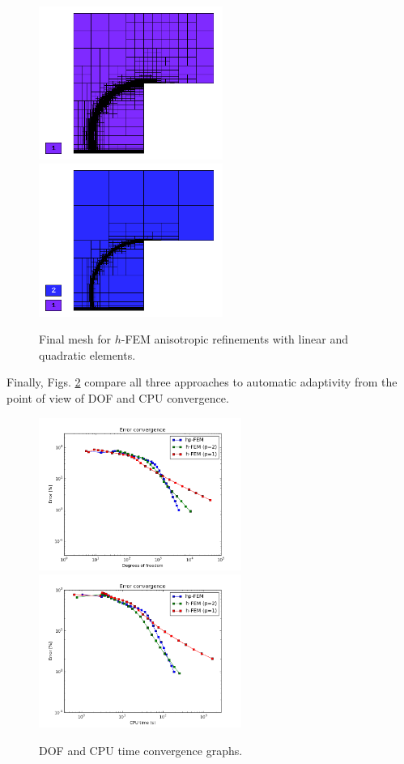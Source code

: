 \begin{figure}[!ht]
\centering
\includegraphics[height=5cm]{nist/nist-12/mesh_h1_aniso.png}\ \
\includegraphics[height=5cm]{nist/nist-12/mesh_h2_aniso.png}
\caption{Final mesh for $h$-FEM anisotropic refinements with linear and quadratic elements.}
\label{fig:nist-12-h-aniso}
\end{figure}

Finally, Figs. \ref{fig:nist-12-conv} compare all
three approaches to automatic adaptivity from the point
of view of DOF and CPU convergence.

\begin{figure}[!ht]
\centering
\includegraphics[height=5cm]{nist/nist-12/conv_dof_aniso.png}\ \
\includegraphics[height=5cm]{nist/nist-12/conv_cpu_aniso.png}
\caption{DOF and CPU time convergence graphs.}
\label{fig:nist-12-conv}
\end{figure}

